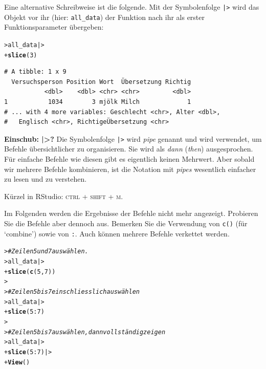 \documentclass[oneside, 10pt]{book}\usepackage[]{graphicx}\usepackage[]{xcolor}
\makeatletter
\newcommand{\hlnum}[1]{\textcolor[rgb]{0.686,0.059,0.569}{#1}}%
\newcommand{\hlcom}[1]{\textcolor[rgb]{0.678,0.584,0.686}{\textit{#1}}}%
\newcommand{\hlopt}[1]{\textcolor[rgb]{0,0,0}{#1}}%
\newcommand{\hlstd}[1]{\textcolor[rgb]{0.345,0.345,0.345}{#1}}%
\newcommand{\hlkwd}[1]{\textcolor[rgb]{0.737,0.353,0.396}{\textbf{#1}}}%
\newenvironment{kframe}{%
 \def\at@end@of@kframe{}%
 \ifinner\ifhmode%
  \def\at@end@of@kframe{\end{minipage}}%
  \begin{minipage}{\columnwidth}%
 \fi\fi%
 \def\FrameCommand##1{\hskip\@totalleftmargin \hskip-\fboxsep
 \colorbox{shadecolor}{##1}\hskip-\fboxsep
     \hskip-\linewidth \hskip-\@totalleftmargin \hskip\columnwidth}%
 \MakeFramed {\advance\hsize-\width
   \@totalleftmargin\z@ \linewidth\hsize
   \@setminipage}}%
 {\par\unskip\endMakeFramed%
 \at@end@of@kframe}
\newenvironment{knitrout}{}{} %
\makeatother
\begin{document}
Eine alternative Schreibweise ist die folgende. 
Mit der Symbolenfolge \texttt{|>} wird das Objekt vor ihr
(hier: \texttt{all\_data}) der Funktion nach ihr 
als erster Funktionsparameter übergeben:
\begin{knitrout}
\color{fgcolor}\begin{kframe}
\begin{alltt}
\hlstd{> }\hlstd{all_data |>}
\hlstd{+ }  \hlkwd{slice}\hlstd{(}\hlnum{3}\hlstd{)}
\end{alltt}
\begin{verbatim}
# A tibble: 1 x 9
  Versuchsperson Position Wort  Übersetzung Richtig
           <dbl>    <dbl> <chr> <chr>         <dbl>
1           1034        3 mjölk Milch             1
# ... with 4 more variables: Geschlecht <chr>, Alter <dbl>,
#   Englisch <chr>, RichtigeÜbersetzung <chr>
\end{verbatim}
\end{kframe}
\end{knitrout}

\medskip

\begin{framed}
\noindent \textbf{Einschub: |>?} 
Die Symbolenfolge \texttt{|>} wird \textit{pipe} genannt und
wird verwendet,
um Befehle übersichtlicher zu organisieren.
Sie wird als \textit{dann} (\textit{then}) ausgesprochen.
Für einfache Befehle wie diesen gibt es eigentlich keinen Mehrwert.
Aber sobald wir mehrere Befehle kombinieren, ist die Notation mit
\textit{pipes} wesentlich einfacher zu lesen und zu verstehen.

Kürzel in RStudio: \textsc{ctrl} + \textsc{shift} + \textsc{m}.
\end{framed}

Im Folgenden werden die Ergebnisse der Befehle nicht mehr angezeigt.
Probieren Sie die Befehle aber dennoch aus.
Bemerken Sie die Verwendung von \texttt{c()} (für `combine')
sowie von \texttt{:}. Auch können mehrere Befehle verkettet werden.
\begin{knitrout}
\color{fgcolor}\begin{kframe}
\begin{alltt}
\hlstd{> }\hlcom{# Zeilen 5 und 7 auswählen.}
\hlstd{> }\hlstd{all_data |>}
\hlstd{+ }  \hlkwd{slice}\hlstd{(}\hlkwd{c}\hlstd{(}\hlnum{5}\hlstd{,} \hlnum{7}\hlstd{))}
\hlstd{> }
\hlstd{> }\hlcom{# Zeilen 5 bis 7 einschliesslich auswählen}
\hlstd{> }\hlstd{all_data |>}
\hlstd{+ }  \hlkwd{slice}\hlstd{(}\hlnum{5}\hlopt{:}\hlnum{7}\hlstd{)}
\hlstd{> }
\hlstd{> }\hlcom{# Zeilen 5 bis 7 auswählen, dann vollständig zeigen}
\hlstd{> }\hlstd{all_data |>}
\hlstd{+ }  \hlkwd{slice}\hlstd{(}\hlnum{5}\hlopt{:}\hlnum{7}\hlstd{) |>}
\hlstd{+ }  \hlkwd{View}\hlstd{()}
\end{alltt}
\end{kframe}
\end{knitrout}
\end{document}
